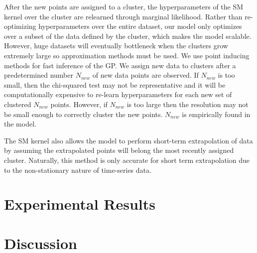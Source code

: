 \documentclass{article}
\begin{document}
After the new points are assigned to a cluster, the hyperparameters of the SM kernel over the cluster are relearned through marginal likelihood. Rather than re-optimizing hyperparameters over the entire dataset, our model only optimizes over a subset of the data defined by the cluster, which makes the model scalable. However, huge datasets will eventually bottleneck when the clusters grow extremely large so approximation methods must be used. We use point inducing methods for fast inference of the GP. We assign new data to clusters after a predetermined number $N_{new}$ of new data points are observed. If $N_{new}$ is too small, then the chi-squared test may not be representative and it will be computationally expensive to re-learn hyperparameters for each new set of clustered $N_{new}$ points. However, if $N_{new}$ is too large then the resolution may not be small enough to correctly cluster the new points. $N_{new}$ is empirically found in the model.

The SM kernel also allows the model to perform short-term extrapolation of data by assuming the extrapolated points will belong the most recently assigned cluster. Naturally, this method is only accurate for short term extrapolation due to the non-stationary nature of time-series data.

\section{Experimental Results}

\section{Discussion}



\end{document}
